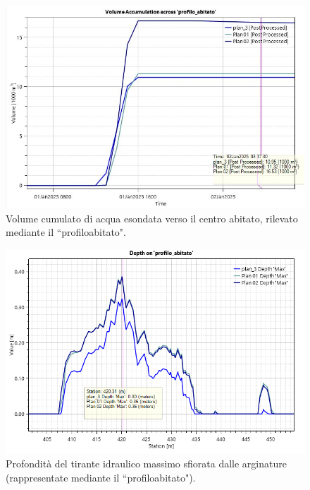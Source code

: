 \begin{figure}[H] \centering
    \includegraphics[scale=0.5]{immagini/volume_accumulation_centro_abitato.JPG}
    \caption{Volume cumulato di acqua esondata verso il centro abitato, rilevato mediante il ``profilo\textunderscore abitato".}
    \label{figure:volume_accumulation_centro_abitato}
\end{figure}

\begin{figure}[H] \centering
    \includegraphics[scale=0.5]{immagini/depth_profilo_abitato.png}
    \caption{Profondità del tirante idraulico massimo sfiorata dalle arginature (rappresentate mediante il ``profilo\textunderscore abitato").}
    \label{figure:depth_profilo_abitato}
\end{figure}

